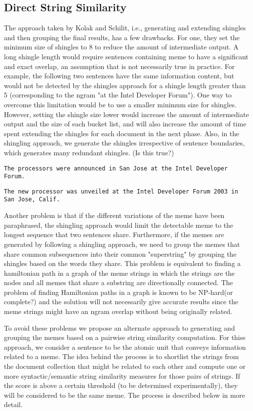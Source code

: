 \documentclass{acm_proc_article-sp}
\begin{document}
\subsection{Direct String Similarity}
The approach taken by Kolak and Schilit, i.e., generating and extending shingles and then grouping the final results, has a few drawbacks. For one, they set the minimum size of shingles to 8 to reduce the amount of intermediate output. A long shingle length would require sentences containing meme to have a significant and exact overlap, an assumption that is not necessarily true in practice. For example, the following two sentences have the same information content, but would not be detected by the shingles approach for a shingle length greater than 5 (corresponding to the ngram "at the Intel Developer Forum"). One way to overcome this limitation would be to use a smaller minimum size for shingles. However, setting the shingle size lower would increase the amount of intermediate output and the size of each bucket list, and will also increase the amount of time spent extending the shingles for each document in the next phase. Also, in the shingling approach, we generate the shingles irrespective of sentence boundaries, which generates many redundant shingles. (Is this true?)

{\tt The processors were announced in San Jose at the Intel Developer Forum.}

{\tt The new processor was unveiled at the Intel Developer Forum 2003 in San Jose, Calif.}

Another problem is that if the different variations of the meme have been paraphrased, the shingling approach would limit the detectable meme to the longest sequence that two sentences share. Furthermore, if the memes are generated by following a shingling approach, we need to group the memes that share common subsequences into their common "superstring" by grouping the shingles based on the words they share. This problem is equivalent to finding a hamiltonian path in a graph of the meme strings in which the strings are the nodes and all memes that share a substring are directionally connected. The problem of finding Hamiltonian paths in a graph is known to be NP-hard(or complete?) and the solution will not necessarily give accurate results since the meme strings might have an ngram overlap without being originally related.

To avoid these problems we propose an alternate approach to generating and grouping the memes based on a pairwise string similarity computation. For thise approach, we consider a sentence to be the atomic unit that conveys information related to a meme. The idea behind the process is to shortlist the strings from the document collection that might be related to each other and compute one or more syntactic/semantic string similarity measures for those pairs of strings. If the score is above a certain threshold (to be determined experimentally), they will be considered to be the same meme. The process is described below in more detail.
\end{document}
